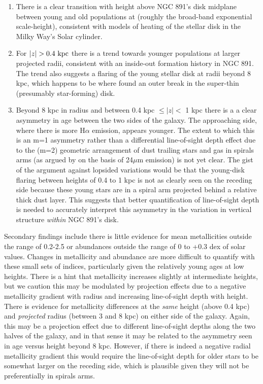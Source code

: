 \begin{enumerate}
  \item There is a clear transition with height above NGC 891's disk
    midplane between young and old populations at 
    (roughly the broad-band exponential scale-height), consistent with
    models of heating of the stellar disk in the Milky Way's Solar
    cylinder.

  \item For $|z| > 0.4~\mathrm{kpc} $ there is a trend towards younger
    populations at larger projected radii, consistent with an
    inside-out formation history in NGC 891. The trend also suggests a
    flaring of the young stellar disk at radii beyond 8 kpc, which
    happens to be where \citet{Schechtman-Rook13} found an outer break
    in the super-thin (presumably star-forming) disk.

  \item Beyond 8 kpc in radius and between 0.4 kpc $\leq |z| <$ 1 kpc
    there is a a clear asymmetry in age between the two sides of the
    galaxy. The approaching side, where there is more H$\alpha$
    emission, appears younger. The extent to which this is an m=1
    asymmetry rather than a differential line-of-sight depth effect
    due to the (m=2) geometric arrangement of dust trailing stars and
    gas in spirals arms (as argued by \citet{Kamphuis07b} on the basis
    of 24$\mu$m emission) is not yet clear.  The gist of the argument
    against lopsided variations would be that the young-disk flaring
    between heights of 0.4 to 1 kpc is not as clearly seen on the
    receding side because these young stars are in a spiral arm
    projected behind a relative thick dust layer.  This suggests that
    better quantification of line-of-sight depth is needed to
    accurately interpret this asymmetry in the variation in vertical
    structure {\it within} NGC 891's disk.

\end{enumerate}

Secondary findings include there is little evidence for mean
metallicities outside the range of 0.2-2.5 \Zsol or abundances outside
the range of 0 to +0.3 dex of solar values. Changes in metallicity and
abundance are more difficult to quantify with these small sets of
indices, particularly given the relatively young ages at low
heights. There is a hint that metallicity increases slightly at
intermediate heights, but we caution this may be modulated by
projection effects due to a negative metallicity gradient with radius
and increasing line-of-sight depth with height. There is evidence for
metallicity differences at the {\it same} height (above 0.4 kpc) and
{\it projected} radius (between 3 and 8 kpc) on either side of the
galaxy. Again, this may be a projection effect due to different
line-of-sight depths along the two halves of the galaxy, and in that
sense it may be related to the asymmetry seen in age versus height
beyond 8 kpc. However, if there is indeed a negative radial
metallicity gradient this would require the line-of-sight depth for
older stars to be somewhat larger on the receding side, which is
plausible given they will not be preferentially in spirals arms.


